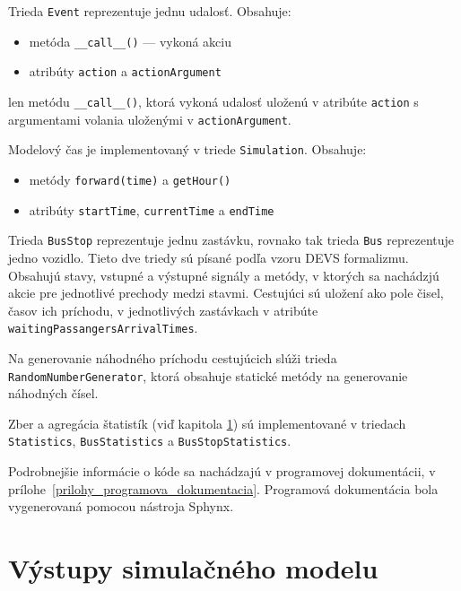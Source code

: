 Trieda \texttt{Event} reprezentuje jednu udalosť.
Obsahuje:
\begin{itemize}
  \item metóda \texttt{\_\_call\_\_()} --- vykoná akciu
  \item atribúty \texttt{action} a \texttt{actionArgument}
\end{itemize}

len metódu \texttt{\_\_call\_\_()}, ktorá vykoná udalosť uloženú v atribúte \texttt{action} s argumentami volania uloženými v \texttt{actionArgument}.

Modelový čas je implementovaný v triede \texttt{Simulation}.
Obsahuje:
\begin{itemize}
  \item metódy \texttt{forward(time)} a \texttt{getHour()}
  \item atribúty \texttt{startTime}, \texttt{currentTime} a \texttt{endTime}
\end{itemize}

Trieda \texttt{BusStop} reprezentuje jednu zastávku, rovnako tak trieda \texttt{Bus} reprezentuje jedno vozidlo.
Tieto dve triedy sú písané podľa vzoru DEVS formalizmu. Obsahujú stavy, vstupné a výstupné signály a metódy, v ktorých sa nachádzjú akcie pre jednotlivé prechody medzi stavmi.
Cestujúci sú uložení ako pole čisel, časov ich príchodu, v jednotlivých zastávkach v atribúte \texttt{waitingPassangersArrivalTimes}.

Na generovanie náhodného príchodu cestujúcich slúži trieda \texttt{RandomNumberGenerator}, ktorá obsahuje statické metódy na generovanie náhodných čísel.

Zber a agregácia štatistík (viď kapitola \ref{vystupy_simulacneho_modelu}) sú implementované v triedach \texttt{Statistics}, \texttt{BusStatistics} a \texttt{BusStopStatistics}.

Podrobnejšie informácie o kóde sa nachádzajú v programovej dokumentácii, v prílohe~\ref{prilohy_programova_dokumentacia}.
Programová dokumentácia bola vygenerovaná pomocou nástroja Sphynx.

\section{Výstupy simulačného modelu}
\label{vystupy_simulacneho_modelu}

